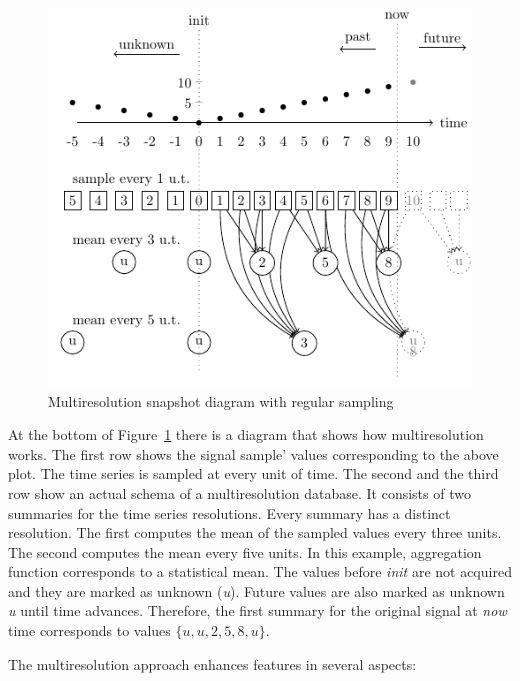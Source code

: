 \begin{figure}
  \centering
  \includegraphics{fig_mtsms_sequence.pdf}
  \caption{Multiresolution snapshot diagram with regular sampling}
  \label{fig:mtsms:sequence}
\end{figure}

At the bottom of Figure~\ref{fig:mtsms:sequence} there is a diagram
that shows how multiresolution works.
%
The first row shows the signal sample' values corresponding to the
above plot. The time series is sampled at every unit of time. 
%
The second and the third row show an actual schema of a
multiresolution database. It consists of two summaries for the time
series resolutions. Every summary has a distinct resolution.
%
The first computes the mean of the sampled values every three units.
The second computes the mean every five units.
%
In this example, aggregation function corresponds to a statistical
mean. The values before \emph{init} are not acquired and they are
marked as unknown (\emph{u}). Future values are also marked as unknown
\emph{u} until time advances. Therefore, the first summary for the
original signal at \emph{now} time corresponds to values
$\{u,u,2,5,8,u\}$.


The multiresolution approach enhances  features in several
aspects:

